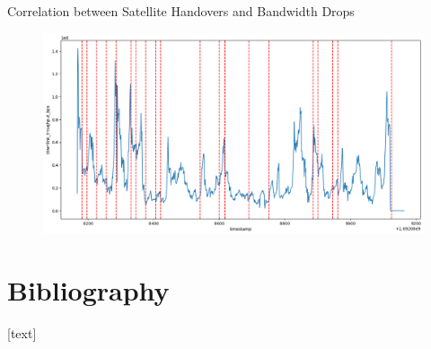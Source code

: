 \documentclass[NET,english,beameralt]{tumbeamer}
\begin{document}
\begin{frame}[fragile]{Correlation between Satellite Handovers and Bandwidth Drops}
    \begin{figure}
        \includegraphics[width=0.8\columnwidth]{pics/correlation_handovers_bw.png}
    \end{figure}
\end{frame}



\section{Bibliography}
\begin{frame}[allowframebreaks]
    
    [text]
    \footnotesize
    
\end{frame}
\end{document}
